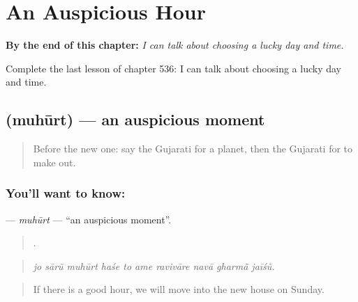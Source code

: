 
\chapter{An Auspicious Hour}
\label{ch:gu-an-auspicious-hour}

\begin{chapteropening}
\textbf{By the end of this chapter:} \emph{I can talk about choosing a lucky day and time.}

Complete the last lesson of chapter 536: I can talk about choosing a lucky day and time.
\end{chapteropening}

\section[\texorpdfstring{\gu{મુહૂર્ત} (muhūrt)}{મુહૂર્ત (muhūrt)}]{ (muhūrt) — an auspicious moment}

\label{lesson:GU-C536-muhurt}



\begin{quote}
Before the new one: say the Gujarati for a planet, then the Gujarati for to make out.
\end{quote}

\subsection*{You'll want to know: }
\textbf{} — \emph{muhūrt} — \textquotedblleft{}an auspicious moment\textquotedblright{}.

\begin{quote}
         .
\end{quote}

\begin{quote}
\emph{jo sārũ muhūrt haśe to ame ravivāre navā gharmā̃ jaīśũ.}
\end{quote}

\begin{quote}
If there is a good hour, we will move into the new house on Sunday.
\end{quote}

